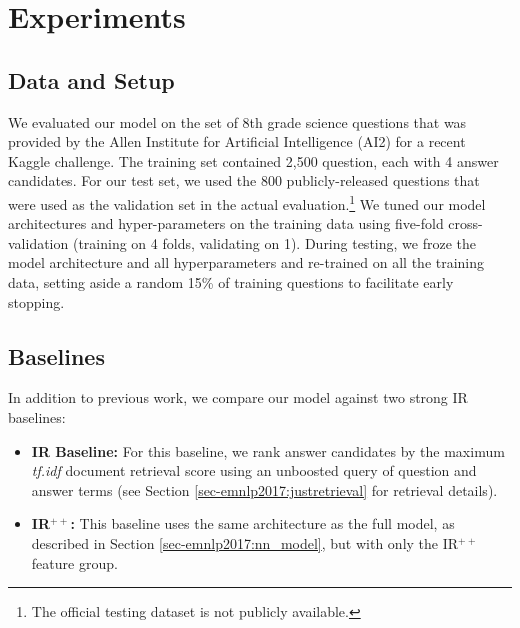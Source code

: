 \section{Experiments}
\label{sec-emnlp2017:experiments}

\subsection{Data and Setup}
We evaluated our model on the set of 8th grade science questions that was provided by the Allen Institute for Artificial Intelligence (AI2) for a recent Kaggle challenge.  The training set contained 2,500 question, each with 4 answer candidates.  For our test set, we used the 800 publicly-released questions that were used as the validation set in the actual evaluation.\footnote{The official testing dataset is not publicly available.}  We tuned our model architectures and hyper-parameters on the training data using five-fold cross-validation (training on 4 folds, validating on 1).  During testing, we froze the model architecture and all hyperparameters and re-trained on all the training data, setting aside a random 15\% of training questions to facilitate early stopping. 

\subsection{Baselines}
In addition to previous work, we compare our model against two strong IR baselines:
%

\begin{itemize}
\item \textbf{IR Baseline:} For this baseline, we rank answer candidates by the maximum \emph{tf.idf} document retrieval score using an unboosted query of question and answer terms (see Section \ref{sec-emnlp2017:justretrieval} for retrieval details).

\item \textbf{IR$^{++}$:}  This baseline uses the same architecture as the full model, as described in Section \ref{sec-emnlp2017:nn_model}, but with only the IR$^{++}$ feature group.
\end{itemize}

